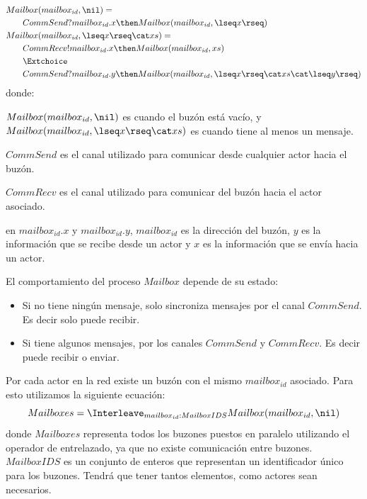 \begin{align}\label{eq:mailbox}
\begin{split}
Mai&lbox(mailbox_{id}, \nil) = {} \\
&CommSend?mailbox_{id}.x \then Mailbox(mailbox_{id}, \lseq x \rseq) \\
Mai&lbox(mailbox_{id}, \lseq x \rseq \cat xs ) = {} \\ 
   &CommRecv!mailbox_{id}.x \then Mailbox(mailbox_{id}, xs) \\
   &\Extchoice \\
   &CommSend?mailbox_{id}.y \then Mailbox(mailbox_{id}, \lseq x \rseq \cat xs \cat \lseq y \rseq ) 
\end{split}
\end{align}
donde:
\begin{description}
 \item $Mailbox(mailbox_{id}, \nil)$ es cuando el buzón está vacío, y $Mailbox(mailbox_{id}, \lseq x \rseq \cat xs )$ es cuando tiene al menos un mensaje. 
 \item $CommSend$ es el canal utilizado para comunicar desde cualquier actor hacia el buzón.
 \item $CommRecv$ es el canal utilizado para comunicar del buzón hacia el actor asociado.
 \item en $mailbox_{id}.x$ y $mailbox_{id}.y$, $mailbox_{id}$ es la dirección del buzón, $y$ es la información que se recibe desde un actor y $x$ es la información que se envía hacia un actor.
 \end{description}
El comportamiento del proceso $Mailbox$ depende de su estado:
\begin{itemize}
\item Si no tiene ningún mensaje, solo sincroniza mensajes por el canal $CommSend$. Es decir solo puede recibir.
\item Si tiene algunos mensajes, por los canales $CommSend$ y $CommRecv$. Es decir puede recibir o enviar.
\end{itemize}

Por cada actor en la red existe un buzón con el mismo $mailbox_{id}$ asociado. Para esto utilizamos la siguiente ecuación:
\begin{equation}\label{eq:mailboxes}
Mailboxes = \Interleave_{ mailbox_{id} : MailboxIDS } Mailbox(mailbox_{id}, \nil) 
\end{equation}
donde $Mailboxes$ representa todos los buzones puestos en paralelo utilizando el operador de entrelazado, ya que no existe comunicación entre buzones. $MailboxIDS$ es un conjunto de enteros que representan un identificador único para los buzones. Tendrá que tener tantos elementos, como actores sean necesarios.

